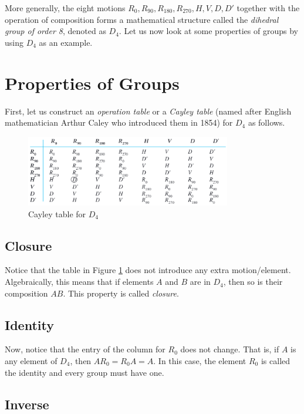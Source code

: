 More generally, the eight motions \(R_0, R_{90}, R_{180}, R_{270}, H, V, D, D'\) together with the operation of composition forms a mathematical structure called the \textit{dihedral group of order 8}, denoted as \(D_4\). Let us now look at some properties of groups by using \(D_4\) as an example.

\section{Properties of Groups}

First, let us construct an \textit{operation table} or a \textit{Cayley table} (named after English mathematician Arthur Caley who introduced them in 1854) for \(D_4\) as follows.

\begin{figure}[h]
    \centering
    \includegraphics[width=0.8\textwidth]{images/ch1-cayley-table.png}
    \caption{Cayley table for \(D_4\)}
    \label{fig:cayley-table}
\end{figure}

\subsection{Closure}

Notice that the table in Figure \ref{fig:cayley-table} does not introduce any extra motion/element. Algebraically, this means that if elements \(A\) and \(B\) are in \(D_4\), then so is their composition \(AB\). This property is called \textit{closure}.

\subsection{Identity}

Now, notice that the entry of the column for \(R_0\) does not change. That is, if \(A\) is any element of \(D_4\), then \(AR_0 = R_0 A = A\). In this case, the element \(R_0\) is called the identity and every group must have one.

\subsection{Inverse}


